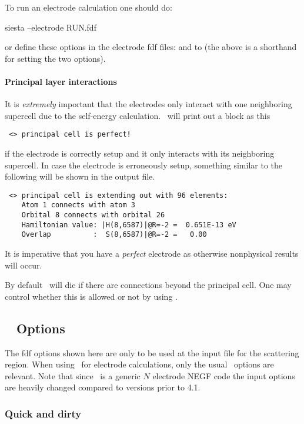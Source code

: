 To run an electrode calculation one should do:
\begin{shellexample}
  siesta --electrode RUN.fdf
\end{shellexample}
or define these options in the electrode fdf files:
 and  to  (the above
 is a shorthand for setting the two options).

\paragraph{Principal layer interactions} %
%

It is \emph{extremely} important that the electrodes only interact
with one neighboring supercell due to the self-energy
calculation. \tsiesta\ will print out a block as this
\begin{verbatim}
 <> principal cell is perfect!
\end{verbatim}
if the electrode is correctly setup and it only interacts with its
neighboring supercell.
%
In case the electrode is erroneously setup, something similar to the
following will be shown in the output file.
\begin{verbatim}
 <> principal cell is extending out with 96 elements:
    Atom 1 connects with atom 3
    Orbital 8 connects with orbital 26
    Hamiltonian value: |H(8,6587)|@R=-2 =  0.651E-13 eV
    Overlap          :  S(8,6587)|@R=-2 =   0.00    
\end{verbatim}
It is imperative that you have a \emph{perfect} electrode as otherwise
nonphysical results will occur.

By default \tsiesta\ will die if there are connections beyond the
principal cell. One may control whether this is allowed or not by
using .

\subsection{\texorpdfstring{\tsiesta\ }{TranSIESTA} Options}

The fdf options shown here are only to be used at the input file for
the scattering region. When using \tsiesta\ for electrode
calculations, only the usual \siesta\ options are relevant.
%
Note that since \tsiesta\ is a generic $N$ electrode NEGF code the
input options are heavily changed compared to versions prior to 4.1.

\subsubsection{Quick and dirty}

